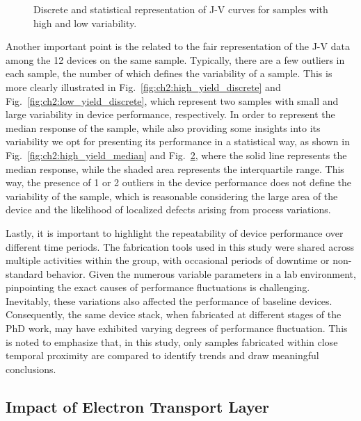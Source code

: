 \begin{figure}[htbp]
\begin{subfigure}[t]{0.4\textwidth}
        \caption{}
        \label{fig:ch2:low_yield_median}
    \end{subfigure}
    \caption{Discrete and statistical representation of J-V curves for samples with high and low variability.}
\end{figure}


Another important point is the related to the fair representation of the J-V data among the 12 devices on the same sample. Typically, there are a few outliers in each sample, the number of which defines the variability of a sample. This is more clearly illustrated in Fig.~\ref{fig:ch2:high_yield_discrete} and Fig.~\ref{fig:ch2:low_yield_discrete}, which represent two samples with small and large variability in device performance, respectively. In order to represent the median response of the sample, while also providing some insights into its variability we opt for presenting its performance in a statistical way, as shown in Fig.~\ref{fig:ch2:high_yield_median} and Fig.~\ref{fig:ch2:low_yield_median}, where the solid line represents the median response, while the shaded area represents the interquartile range. This way, the presence of 1 or 2 outliers in the device performance does not define the variability of the sample, which is reasonable considering the large area of the device and the likelihood of localized defects arising from process variations. 

Lastly, it is important to highlight the repeatability of device performance over different time periods. The fabrication tools used in this study were shared across multiple activities within the group, with occasional periods of downtime or non-standard behavior. Given the numerous variable parameters in a lab environment, pinpointing the exact causes of performance fluctuations is challenging. Inevitably, these variations also affected the performance of baseline devices. Consequently, the same device stack, when fabricated at different stages of the PhD work, may have exhibited varying degrees of performance fluctuation. This is noted to emphasize that, in this study, only samples fabricated within close temporal proximity are compared to identify trends and draw meaningful conclusions.

\subsection{Impact of Electron Transport Layer}

